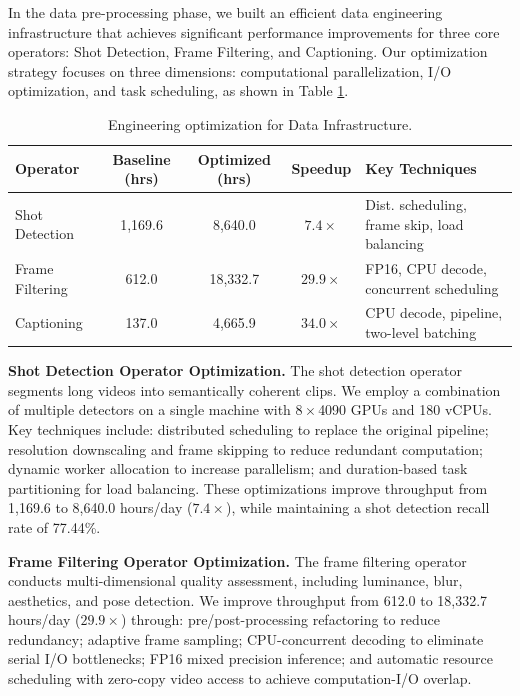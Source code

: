 In the data pre-processing phase, we built an efficient data engineering infrastructure that achieves significant performance improvements for three core operators: Shot Detection, Frame Filtering, and Captioning. Our optimization strategy focuses on three dimensions: computational parallelization, I/O optimization, and task scheduling, as shown in Table \ref{tab:data_engineering}.

\begin{table}[h]
\centering
\footnotesize
\caption{Engineering optimization for Data Infrastructure.}
\label{tab:data_engineering}
\begin{tabular}{lcccp{4.5cm}}
\toprule
\textbf{Operator} & \textbf{Baseline (hrs)} & \textbf{Optimized (hrs)} & \textbf{Speedup} & \textbf{Key Techniques} \\
\midrule
Shot Detection  & 1,169.6 & 8,640.0  & $7.4\times$  & Dist. scheduling, frame skip, load balancing \\
Frame Filtering & 612.0   & 18,332.7 & $29.9\times$ & FP16, CPU decode, concurrent scheduling \\
Captioning      & 137.0   & 4,665.9  & $34.0\times$ & CPU decode, pipeline, two-level batching \\
\bottomrule
\end{tabular}
\end{table}



\textbf{Shot Detection Operator Optimization.} The shot detection operator segments long videos into semantically coherent clips. We employ a combination of multiple detectors on a single machine with $8\times$4090 GPUs and 180 vCPUs. Key techniques include: distributed scheduling to replace the original pipeline; resolution downscaling and frame skipping to reduce redundant computation; dynamic worker allocation to increase parallelism; and duration-based task partitioning for load balancing. These optimizations improve throughput from 1,169.6 to 8,640.0 hours/day ($7.4\times$), while maintaining a shot detection recall rate of 77.44\%.

\textbf{Frame Filtering Operator Optimization.} The frame filtering operator conducts multi-dimensional quality assessment, including luminance, blur, aesthetics, and pose detection. We improve throughput from 612.0 to 18,332.7 hours/day ($29.9\times$) through: pre/post-processing refactoring to reduce redundancy; adaptive frame sampling; CPU-concurrent decoding to eliminate serial I/O bottlenecks; FP16 mixed precision inference; and automatic resource scheduling with zero-copy video access to achieve computation-I/O overlap.

